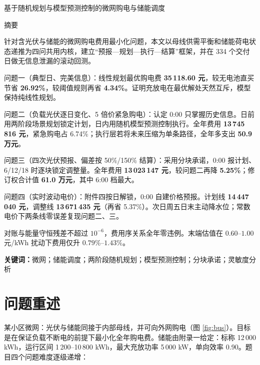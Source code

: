\documentclass[12pt,a4paper]{ctexart}
\begin{document}
\thispagestyle{plain}
\vspace*{-2em}
\begin{center}
{\Large\heiti 基于随机规划与模型预测控制的微网购电与储能调度}
\end{center}
\vspace{1.5em}
\begin{center}\large\heiti 摘\quad 要\end{center}

针对含光伏与储能的微网购电费用最小化问题，本文以母线供需平衡和储能荷电状态递推为四问共用内核，建立“预报—规划—执行—结算”框架，并在 334 个交付日做无信息泄漏的滚动回测。

问题一（典型日、完美信息）：线性规划最优购电费 \textbf{35\,118.60 元}，较无电池直买节省 \textbf{26.92\%}，较阈值规则再省 \textbf{4.34\%}。证明充放电在最优解处天然互斥，模型保持纯线性规划。

问题二（负载光伏逐日变化、5 倍价紧急购电）：认定 0:00 只掌握历史信息。日前用两阶段场景规划锁定计划，日内用随机模型预测控制执行。全年费用 \textbf{13\,745\,816 元}，紧急购电占 6.74\%；执行层若将未来压缩为单条路径，全年多支出 \textbf{50.9 万元}。

问题三（四次光伏预报、偏差按 50\%/150\% 结算）：采用分块承诺，0:00 报计划、6/12/18 时逐块锁定调整量。全年费用 \textbf{13\,023\,147 元}，较问题二再降 \textbf{5.25\%}；修订权合计值 \textbf{61.0 万元}，其中 6:00 档最大。

问题四（实时波动电价）：附件四按日解锁，0:00 自建价格预报。计划线 \textbf{14\,447\,040 元}，调整线 \textbf{13\,671\,435 元}（再省 5.37\%）。次日周五日末主动降水位；常数电价下两条线零误差复现问题二、三。

对账与能量守恒残差不超过 $10^{-6}$，费用序关系全年零违例。末端估值在 $0.60$--$1.00$ 元/kWh 扰动下费用仅升 $0.79\%$--$1.43\%$。

\vspace{0.5em}
\noindent\textbf{关键词：}微网；储能调度；两阶段随机规划；模型预测控制；分块承诺；灵敏度分析

\newpage

\section{问题重述}

某小区微网：光伏与储能同接于内部母线，并可向外网购电（图 \ref{fig:bus}）。目标是在保证负载不断电的前提下最小化全年购电费。储能由附录一给定：标称 12\,000 kWh，运行区间 1\,200--10\,800 kWh，最大充放功率 5\,000 kW，单向效率 0.90。题目四个问题难度逐级递增：
\end{document}
